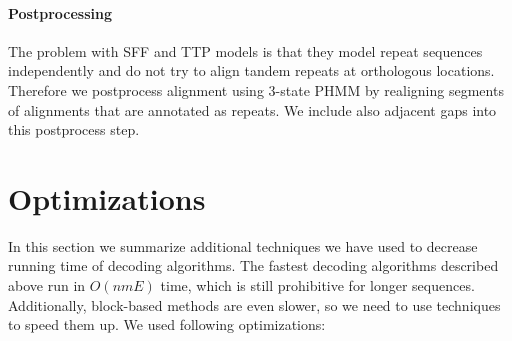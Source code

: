 \paragraph{Postprocessing}
The problem with SFF and TTP models is that they model repeat sequences
independently and do not try to align tandem repeats at orthologous locations.
Therefore we postprocess alignment using 3-state PHMM by realigning segments of
alignments that are annotated as repeats. We include also adjacent gaps into
this postprocess step.

\section{Optimizations}

In this section we summarize additional techniques we have used to decrease
running time of decoding algorithms. The fastest decoding algorithms described
above run in $O(nmE)$ time, which is still prohibitive for longer sequences.
Additionally, block-based methods are even slower, so we need to use techniques
to speed them up. We used following optimizations:
